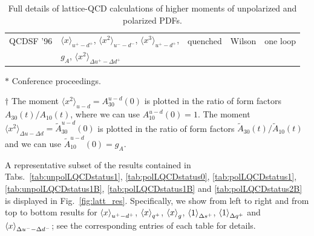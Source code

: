 \begin{table}[!t]
\begin{threeparttable}
\begin{tabular}{lllll}
  QCDSF '96 \cite{Gockeler:1995wg} &
  $\langle x\rangle_{u^+-d^+}$,
  $\langle x^2\rangle_{u^--d^-}$,
  $\langle x^3\rangle_{u^+-d^+}$, &
  quenched & Wilson & one loop \\
  & $g_A$,
  $\langle x^2\rangle_{\Delta u^+-\Delta d^+}$ & & &\\
\bottomrule
\end{tabular}
\begin{tablenotes}
\scriptsize
\item[$*$] Conference proceedings.
\item[$\dagger$] The moment $\langle x^2\rangle_{u-d}=A_{30}^{u-d}(0)$ is plotted 
in the ratio of form factors $A_{30}(t)/A_{10}(t)$, where we can use 
$A_{10}^{u-d}(0)=1$. 
The moment $\langle x^2\rangle_{\Delta u-\Delta d}=\tilde A_{30}^{u-d}(0)$ is plotted 
in the ratio of form factors $\tilde A_{30}(t)/\tilde A_{10}(t)$ and we can use 
$\tilde A_{10}^{u-d}(0)=g_A$.
\end{tablenotes}
\end{threeparttable}
\caption{\small Full details of lattice-QCD calculations of higher moments of 
unpolarized and polarized PDFs.}
\label{tab:latticebiblast}
\end{table}

A representative subset of the results contained in
Tabs.~\ref{tab:unpolLQCDstatus1}, \ref{tab:polLQCDstatus0},
\ref{tab:polLQCDstatus1}, \ref{tab:unpolLQCDstatus1B},
\ref{tab:polLQCDstatus1B} and \ref{tab:polLQCDstatus2B}
is displayed in Fig.~\ref{fig:latt_res}.
%
Specifically, we show from left to right and from top to bottom
results for $\left\langle x\right\rangle_{u^+-d^+}$, $\left\langle x\right\rangle_{q^+}$, $\left\langle x\right\rangle_{g}$,
$\left\langle 1 \right\rangle_{\Delta s^+}$, $\left\langle 1\right\rangle_{\Delta q^+}$ and
$\left\langle x\right\rangle_{\Delta u^- - \Delta d^-}$;
see the corresponding entries of each table for details.

